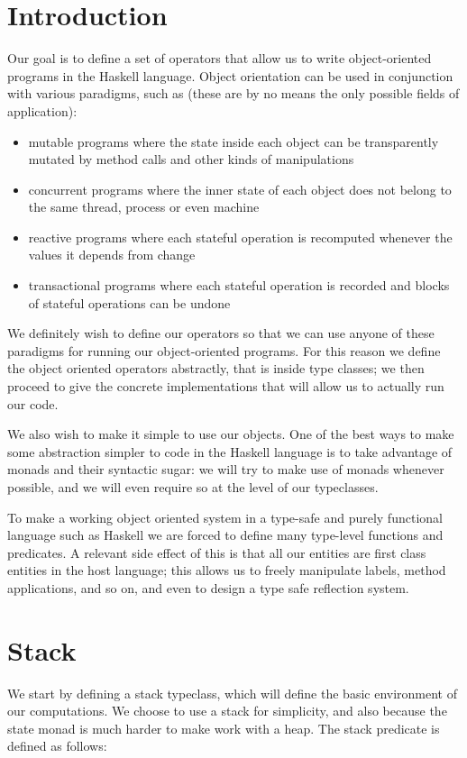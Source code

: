 \section{Introduction}
Our goal is to define a set of operators that allow us to write object-oriented programs in the Haskell language. Object orientation can be
used in conjunction with various paradigms, such as (these are by no means the only possible fields of application):
\begin{itemize}
\item mutable programs where the state inside each object can be transparently mutated by method calls and other kinds of manipulations
\item concurrent programs where the inner state of each object does not belong to the same thread, process or even machine
\item reactive programs where each stateful operation is recomputed whenever the values it depends from change
\item transactional programs where each stateful operation is recorded and blocks of stateful operations can be undone
\end{itemize}

We definitely wish to define our operators so that we can use anyone of these paradigms for running our object-oriented programs. For this
reason we define the object oriented operators abstractly, that is inside type classes; we then proceed to give the concrete implementations 
that will allow us to actually run our code.

We also wish to make it simple to use our objects. One of the best ways to make some abstraction simpler to code in the Haskell language is to
take advantage of monads and their syntactic sugar: we will try to make use of monads whenever possible, and we will even require so at the
level of our typeclasses.

To make a working object oriented system in a type-safe and purely functional language such as Haskell we are forced to define many 
type-level functions and predicates. A relevant side effect of this is that all our entities are first class entities in the host language;
this allows us to freely manipulate labels, method applications, and so on, and even to design a type safe reflection system.


\section{Stack}
We start by defining a stack typeclass, which will define the basic environment of our computations. We choose to use a stack for simplicity,
and also because the state monad is much harder to make work with a heap. The stack predicate is defined as follows:

